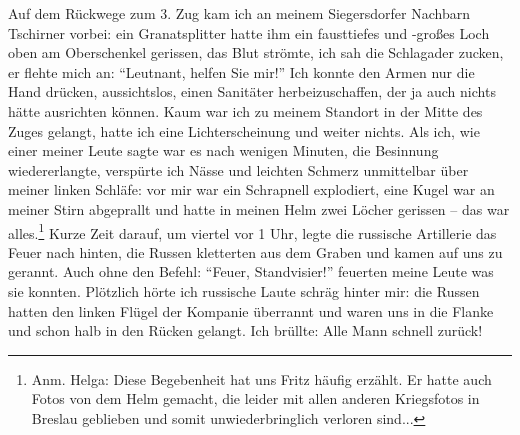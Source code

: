 \documentclass[a5paper,pagesize,10pt,twoside=true]{scrbook}
\renewcommand{\marginpar}[2][]{}
\begin{document}
\marginpar{erstes Heft gefüllt am 19.11.1998}






Auf dem Rückwege zum 3. Zug kam ich an meinem Siegersdorfer Nachbarn Tschirner vorbei: ein Granatsplitter hatte ihm ein fausttiefes und -großes Loch oben am Oberschenkel gerissen, das Blut strömte, ich sah die Schlagader zucken, er flehte mich an: \enquote{Leutnant, helfen Sie mir!} Ich konnte den Armen nur die Hand drücken, aussichtslos, einen Sanitäter herbeizuschaffen, der ja auch nichts hätte ausrichten können. Kaum war ich zu meinem Standort in der Mitte des Zuges gelangt, hatte ich eine Lichterscheinung und weiter nichts. Als ich, wie einer meiner Leute sagte war es nach wenigen Minuten, die Besinnung wiedererlangte, verspürte ich Nässe und leichten Schmerz unmittelbar über meiner linken Schläfe: vor mir war ein Schrapnell explodiert, eine Kugel war an meiner Stirn abgeprallt und hatte in meinen Helm zwei Löcher gerissen -- das war alles.\footnote{Anm. Helga: Diese Begebenheit hat uns Fritz häufig erzählt. Er hatte auch Fotos von dem Helm gemacht, die leider mit allen anderen Kriegsfotos in Breslau geblieben und somit unwiederbringlich verloren sind...}  Kurze Zeit darauf, um viertel vor 1 Uhr, legte die russische Artillerie das Feuer nach hinten, die Russen kletterten aus dem Graben und kamen auf uns zu gerannt. Auch ohne den Befehl: \enquote{Feuer, Standvisier!} feuerten meine Leute was sie konnten. Plötzlich hörte ich russische Laute schräg hinter mir: die Russen hatten den linken Flügel der Kompanie überrannt und waren uns in die Flanke und schon halb in den Rücken gelangt. Ich brüllte: Alle Mann schnell zurück!
\end{document}
